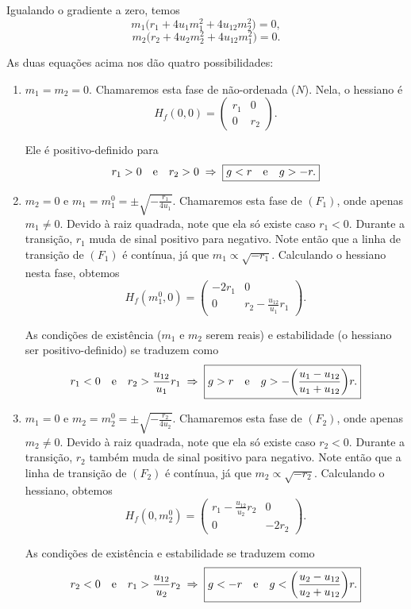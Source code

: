 \documentclass[a4paper,10pt]{article}
\begin{document}
Igualando o gradiente a zero, temos
$$
\boxed{m_1 \Big(
r_1 + 4 u_1 m_1^2 + 4 u_{12} m_2^2
\Big) = 0,}
$$
$$
\boxed{m_2 \Big(
r_2 + 4 u_2 m_2^2 + 4 u_{12} m_1^2
\Big) = 0.}
$$

\n\n\n

As duas equações acima nos dão quatro possibilidades:
\begin{enumerate}
\item $m_1 = m_2 = 0$. Chamaremos esta fase de não-ordenada ($N$). Nela, o hessiano é
$$
H_f(0, 0) =
\begin{pmatrix}
r_1 & 0 \\
0 & r_2
\end{pmatrix}.
$$

Ele é positivo-definido para
$$
r_1 > 0 \quad \mathrm{e} \quad r_2 > 0 \; \Rightarrow \; \boxed{g < r \quad \mathrm{e} \quad g > -r.}
$$



\item $m_2 = 0$ e $m_1 = m^0_1 = \pm\sqrt{-\frac{r_1}{4 u_1}}$. Chamaremos esta fase de $(F_1)$, onde apenas $m_1 \neq 0$. Devido à raiz quadrada, note que ela só existe caso $r_1 < 0$. Durante a transição, $r_1$ muda de sinal positivo para negativo. Note então que a linha de transição de $(F_1)$ é contínua, já que $m_1 \propto \sqrt{-r_1}$. Calculando o hessiano nesta fase, obtemos
$$
H_f(m_1^0, 0) =
\begin{pmatrix}
-2 r_1 & 0 \\
0 & r_2 - \frac{u_{12}}{u_1} r_1
\end{pmatrix}.
$$

As condições de existência ($m_1$ e $m_2$ serem reais) e estabilidade (o hessiano ser positivo-definido) se traduzem como
$$
r_1 < 0 \quad \mathrm{e} \quad r_2 > \frac{u_{12}}{u_1} r_1
\; \Rightarrow \;
\boxed{g > r \quad \mathrm{e} \quad g > -\qty(\frac{u_1 - u_{12}}{u_1 + u_{12}}) r. }
$$



\item $m_1 = 0$ e $m_2 = m^0_2 = \pm\sqrt{-\frac{r_2}{4 u_2}}$. Chamaremos esta fase de $(F_2)$, onde apenas $m_2 \neq 0$. Devido à raiz quadrada, note que ela só existe caso $r_2 < 0$. Durante a transição, $r_2$ também muda de sinal positivo para negativo. Note então que a linha de transição de $(F_2)$ é contínua, já que $m_2 \propto \sqrt{-r_2}$. Calculando o hessiano, obtemos
$$
H_f(0, m_2^0) =
\begin{pmatrix}
r_1 - \frac{u_{12}}{u_2} r_2 & 0 \\
0 & -2 r_2
\end{pmatrix}.
$$

As condições de existência e estabilidade se traduzem como
$$
r_2 < 0 \quad \mathrm{e} \quad r_1 > \frac{u_{12}}{u_2} r_2
\; \Rightarrow \;
\boxed{g < -r \quad \mathrm{e} \quad g < \qty(\frac{u_{2} - u_{12}}{u_2 + u_{12}}) r. }
$$






\end{enumerate}
\end{document}
